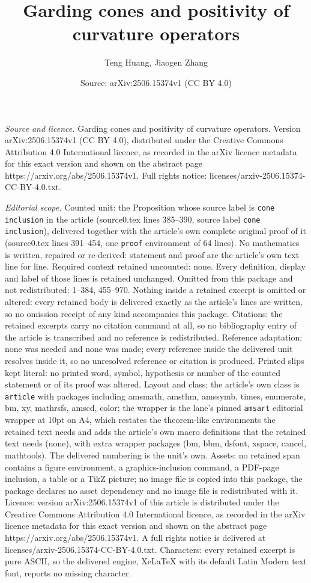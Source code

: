 \documentclass[10pt,a4paper]{amsart}
\title[Garding cones and positivity of curvature operators]{Garding cones and positivity of curvature operators}
\author{Teng Huang, Jiaogen Zhang}
\date{Source: arXiv:2506.15374v1 (CC BY 4.0)}
\begin{document}
\maketitle

\noindent\emph{Source and licence.} Garding cones and positivity of curvature operators. Version arXiv:2506.15374v1 (CC BY 4.0), distributed under the Creative Commons Attribution 4.0 International licence, as recorded in the arXiv licence metadata for this exact version and shown on the abstract page https://arxiv.org/abs/2506.15374v1. Full rights notice: licenses/arxiv-2506.15374-CC-BY-4.0.txt.\par\smallskip

\noindent\textit{Editorial scope.} Counted unit: the Proposition whose source label is \texttt{cone inclusion} in the article (source0.tex lines 385--390, source label \texttt{cone inclusion}), delivered together with the article's own complete original proof of it (source0.tex lines 391--454, one \texttt{proof} environment of 64 lines). No mathematics is written, repaired or re-derived: statement and proof are the article's own text line for line. Required context retained uncounted: none. Every definition, display and label of those lines is retained unchanged. Omitted from this package and not redistributed: 1--384, 455--970. Nothing inside a retained excerpt is omitted or altered: every retained body is delivered exactly as the article's lines are written, so no omission receipt of any kind accompanies this package. Citations: the retained excerpts carry no citation command at all, so no bibliography entry of the article is transcribed and no reference is redistributed. Reference adaptation: none was needed and none was made; every reference inside the delivered unit resolves inside it, so no unresolved reference or citation is produced. Printed slips kept literal: no printed word, symbol, hypothesis or number of the counted statement or of its proof was altered. Layout and class: the article's own class is \texttt{article} with packages including amsmath, amsthm, amssymb, times, enumerate, bm, xy, mathrsfs, amscd, color; the wrapper is the lane's pinned \texttt{amsart} editorial wrapper at 10pt on A4, which restates the theorem-like environments the retained text needs and adds the article's own macro definitions that the retained text needs (none), with extra wrapper packages (bm, bbm, dsfont, xspace, cancel, mathtools). The delivered numbering is the unit's own. Assets: no retained span contains a figure environment, a graphics-inclusion command, a PDF-page inclusion, a table or a TikZ picture; no image file is copied into this package, the package declares no asset dependency and no image file is redistributed with it. Licence: version arXiv:2506.15374v1 of this article is distributed under the Creative Commons Attribution 4.0 International licence, as recorded in the arXiv licence metadata for this exact version and shown on the abstract page https://arxiv.org/abs/2506.15374v1. A full rights notice is delivered at licenses/arxiv-2506.15374-CC-BY-4.0.txt. Characters: every retained excerpt is pure ASCII, so the delivered engine, XeLaTeX with its default Latin Modern text font, reports no missing character.
\end{document}
